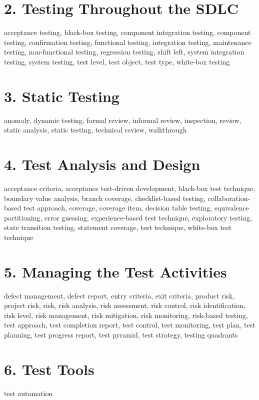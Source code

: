 \documentclass{article}
\begin{document}
\begin{multicols}{3}
{\section*{2. Testing Throughout the SDLC}
acceptance testing, black-box testing, component integration testing, component testing, confirmation testing, functional testing, integration testing, maintenance testing, non-functional testing, regression testing, shift left, system integration testing, system testing, test level, test object, test type, white-box testing\\

\section*{3. Static Testing}
anomaly, dynamic testing, formal review, informal review, inspection, review, static analysis, static testing, technical review, walkthrough\\

\section*{4. Test Analysis and Design}
acceptance criteria, acceptance test-driven development, black-box test technique, boundary value analysis, branch coverage, checklist-based testing, collaboration-based test approach, coverage, coverage item, decision table testing, equivalence partitioning, error guessing, experience-based test technique, exploratory testing, state transition testing, statement coverage, test technique, white-box test technique\\

\section*{5. Managing the Test Activities}
defect management, defect report, entry criteria, exit criteria, product risk, project risk, risk, risk analysis, risk assessment, risk control, risk identification, risk level, risk management, risk mitigation, risk monitoring, risk-based testing, test approach, test completion report, test control, test monitoring, test plan, test planning, test progress report, test pyramid, test strategy, testing quadrants\\

\section*{6. Test Tools}
test automation
}


\end{multicols}
\end{document}
